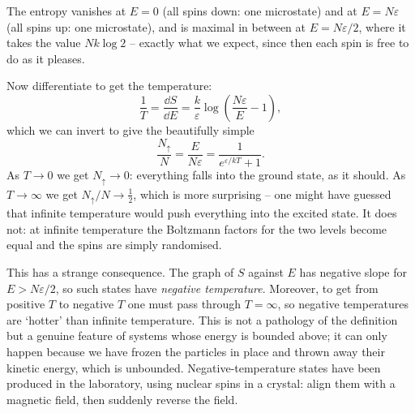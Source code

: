 \begin{example}
\begin{center}
	\end{center}
	The entropy vanishes at $E = 0$ (all spins down: one microstate) and at $E = N\varepsilon$ (all spins up: one microstate), and is maximal in between at $E = N\varepsilon/2$, where it takes the value $Nk\log 2$ -- exactly what we expect, since then each spin is free to do as it pleases.

	Now differentiate to get the temperature:
	$$
	\frac 1T = \frac{\dd S}{\dd E} = \frac k\varepsilon \log\left(\frac{N\varepsilon}{E} - 1\right),
	$$
	which we can invert to give the beautifully simple
	$$
	\frac{N_\uparrow}{N} = \frac{E}{N\varepsilon} = \frac{1}{e^{\varepsilon/kT} + 1}.
	$$
	As $T \to 0$ we get $N_\uparrow \to 0$: everything falls into the ground state, as it should. As $T \to \infty$ we get $N_\uparrow/N \to \tfrac 12$, which is more surprising -- one might have guessed that infinite temperature would push everything into the excited state. It does not: at infinite temperature the Boltzmann factors for the two levels become equal and the spins are simply randomised.

	This has a strange consequence. The graph of $S$ against $E$ has negative slope for $E > N\varepsilon/2$, so such states have \emph{negative temperature}. Moreover, to get from positive $T$ to negative $T$ one must pass through $T = \infty$, so negative temperatures are `hotter' than infinite temperature. This is not a pathology of the definition but a genuine feature of systems whose energy is bounded above; it can only happen because we have frozen the particles in place and thrown away their kinetic energy, which is unbounded. Negative-temperature states have been produced in the laboratory, using nuclear spins in a crystal: align them with a magnetic field, then suddenly reverse the field.


\end{example}
